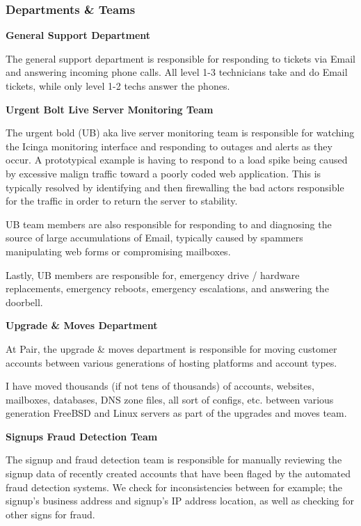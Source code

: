 \documentclass{article}
\begin{document}
\subsubsection{Departments \& Teams} 

\noindent
\textbf{General Support Department}

The general support department is responsible for responding to tickets via
Email and answering incoming phone calls. All level 1-3 technicians take and do
Email tickets, while only level 1-2 techs answer the phones. 

\vspace{.25em}
\noindent
\textbf{Urgent Bolt  Live Server Monitoring Team}

The urgent bold (UB) aka live server monitoring team is responsible for
watching the Icinga monitoring interface and responding to outages and alerts
as they occur. A prototypical example is having to respond to a load spike
being caused by excessive malign traffic toward a poorly coded web application.
This is typically resolved by identifying and then firewalling the bad actors
responsible for the traffic in order to return the server to stability.

UB team members are also responsible for responding to and diagnosing the
source of large accumulations of Email, typically caused by spammers
manipulating web forms or compromising mailboxes.

Lastly, UB members are responsible for, emergency drive / hardware
replacements, emergency reboots, emergency escalations, and answering the
doorbell.

\vspace{.5em}
\noindent
\textbf{Upgrade \& Moves Department}

At Pair, the upgrade \& moves department is responsible for moving customer
accounts between various generations of hosting platforms and account types.

I have moved thousands (if not tens of thousands) of accounts, websites,
mailboxes, databases, DNS zone files, all sort of configs, etc. between various
generation FreeBSD and Linux servers as part of the upgrades and moves team.

\vspace{.5em}
\noindent
\textbf{Signups Fraud Detection Team}

The signup and fraud detection team is responsible for manually reviewing the
signup data of recently created accounts that have been flaged by the automated
fraud detection systems. We check for inconsistencies between for example; the
signup's business address and signup's IP address location, as well as checking
for other signs for fraud.
\end{document}

